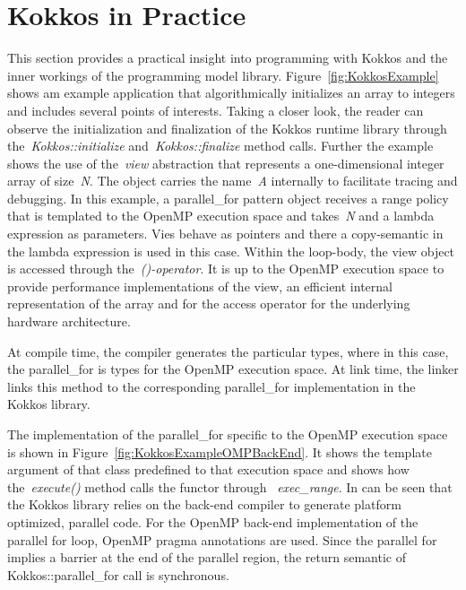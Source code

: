 \section{Kokkos in Practice}\label{chap:kokkosExample}

This section provides a practical insight into programming with Kokkos and the inner workings of the programming model library. Figure~\ref{fig:KokkosExample} shows am example application that algorithmically initializes an array to integers and includes several points of interests. Taking a closer look, the reader can observe the initialization and finalization of the Kokkos runtime library through the~\emph{Kokkos::initialize} and~\emph{Kokkos::finalize} method calls. Further the example shows the use of the~\emph{view} abstraction that represents a one-dimensional integer array of size~\emph{N}. The object carries the name~\emph{A} internally to facilitate tracing and debugging. In this example, a parallel\_for pattern object receives a range policy that is templated to the OpenMP execution space and takes~\emph{N} and a lambda expression as parameters. Vies behave as pointers and there a copy-semantic in the lambda expression is used in this case. Within the loop-body, the view object is accessed through the~\emph{()-operator}. It is up to the OpenMP execution space to provide performance implementations of the view, an efficient internal representation of the array and for the access operator for the underlying hardware architecture.

At compile time, the compiler generates the particular types, where in this case, the parallel\_for is types for the OpenMP execution space. At link time, the linker links this method to the corresponding parallel\_for implementation in the Kokkos library.

The implementation of the parallel\_for specific to the OpenMP execution space is shown in Figure~\ref{fig:KokkosExampleOMPBackEnd}. It shows the template argument of that class predefined to that execution space and shows how the~\emph{execute()} method calls the functor through ~\emph{exec\_range}. In can be seen that the Kokkos library relies on the back-end compiler to generate platform optimized, parallel code. For the OpenMP back-end implementation of the parallel for loop, OpenMP pragma annotations are used. Since the parallel for implies a barrier at the end of the parallel region, the return semantic of Kokkos::parallel\_for call is synchronous. 

